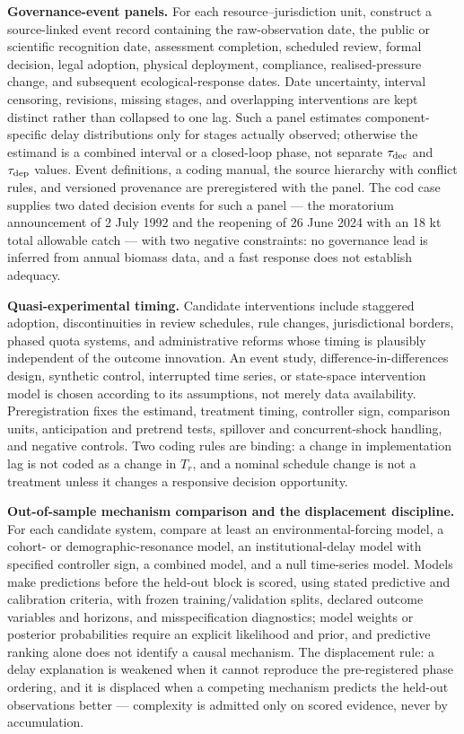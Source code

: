\documentclass[11pt]{article}
\begin{document}
\textbf{Governance-event panels.} For each resource--jurisdiction unit,
construct a source-linked event record containing the raw-observation
date, the public or scientific recognition date, assessment completion,
scheduled review, formal decision, legal adoption, physical deployment,
compliance, realised-pressure change, and subsequent ecological-response
dates. Date uncertainty, interval censoring, revisions, missing stages,
and overlapping interventions are kept distinct rather than collapsed to one
lag. Such a panel estimates component-specific delay distributions only
for stages actually observed; otherwise the estimand is a combined
interval or a closed-loop phase, not separate \(\tau_{\rm dec}\) and
\(\tau_{\rm dep}\) values. Event definitions, a coding manual, the source hierarchy with conflict rules, and versioned provenance are preregistered with the panel. The cod case supplies two dated decision
events for such a panel --- the moratorium announcement of 2 July 1992
and the reopening of 26 June 2024 with an 18 kt total allowable catch
--- with two negative constraints: no governance lead is inferred from
annual biomass data, and a fast response does not establish adequacy.

\textbf{Quasi-experimental timing.} Candidate interventions include
staggered adoption, discontinuities in review schedules, rule changes,
jurisdictional borders, phased quota systems, and administrative reforms
whose timing is plausibly independent of the outcome innovation. An
event study, difference-in-differences design, synthetic control,
interrupted time series, or state-space intervention model is chosen
according to its assumptions, not merely data availability. Preregistration fixes the estimand, treatment timing, controller sign, comparison units, anticipation and pretrend tests, spillover and concurrent-shock handling, and negative controls. Two coding
rules are binding: a change in implementation lag is not coded as a
change in \(T_r\), and a nominal schedule change is not a treatment
unless it changes a responsive decision opportunity.

\textbf{Out-of-sample mechanism comparison and the displacement
discipline.} For each candidate system, compare at least an
environmental-forcing model, a cohort- or demographic-resonance model,
an institutional-delay model with specified controller sign, a combined
model, and a null time-series model. Models make predictions before the
held-out block is scored, using stated predictive and calibration
criteria, with frozen training/validation splits, declared outcome variables and horizons, and misspecification diagnostics; model weights or posterior probabilities require an explicit
likelihood and prior, and predictive ranking alone does not identify a
causal mechanism. The displacement rule: a delay explanation is weakened
when it cannot reproduce the pre-registered phase ordering, and it is
displaced when a competing mechanism predicts the held-out observations
better --- complexity is admitted only on scored evidence, never by
accumulation.
\end{document}
